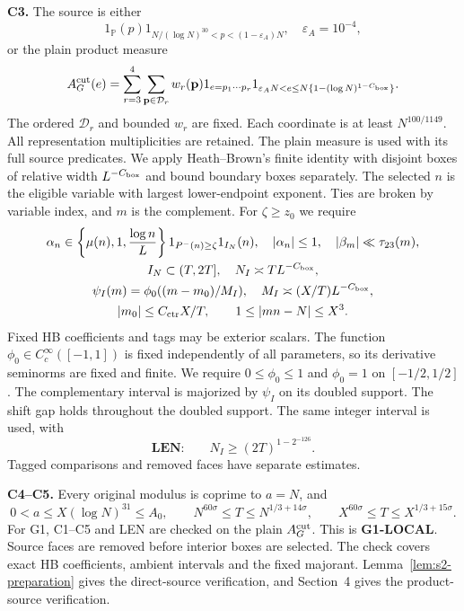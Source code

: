 \textbf{C3.} The source is either
\[
 1_{\mathbb P}(p)1_{N/(\log N)^{30}<p<(1-\varepsilon_A)N},\quad
 \varepsilon_A=10^{-4},
\]
or the plain product measure
\[
 A_G^{\rm cut}(e)=\sum_{r=3}^4\sum_{\mathbf p\in\mathcal D_r}
 w_r(\mathbf p)1_{e=p_1\cdots p_r}
 1_{\varepsilon_A N<e\le N\{1-(\log N)^{1-C_{\rm box}}\}}.
\]
The ordered $\mathcal D_r$ and bounded $w_r$ are fixed.
Each coordinate is at least $N^{100/1149}$.
All representation multiplicities are retained.
The plain measure is used with its full source predicates.
We apply Heath--Brown's finite identity \cite{ref6} with disjoint boxes of relative width $L^{-C_{\rm box}}$
and bound boundary boxes separately.
The selected $n$ is the eligible variable with largest lower-endpoint exponent.
Ties are broken by variable index, and $m$ is the complement.
For $\zeta\ge z_0$ we require
\[
\begin{gathered}
 \alpha_n\in\left\{\mu(n),1,{\log n\over L}\right\}
 1_{P^-(n)\ge\zeta}1_{I_N}(n),\quad |\alpha_n|\le1,
 \quad|\beta_m|\ll\tau_{23}(m),\\
 I_N\subset(T,2T],\quad N_I\asymp TL^{-C_{\rm box}},\\
 \psi_I(m)=\phi_0((m-m_0)/M_I),\quad M_I\asymp(X/T)L^{-C_{\rm box}},\\
 |m_0|\le C_{\rm ctr}X/T,\qquad 1\le|mn-N|\le X^3.
\end{gathered}
\]
Fixed HB coefficients and tags may be exterior scalars.
The function $\phi_0\in C_c^\infty([-1,1])$ is fixed independently of all parameters,
so its derivative seminorms are fixed and finite.
We require $0\le\phi_0\le1$ and $\phi_0=1$ on $[-1/2,1/2]$.
The complementary interval is majorized by $\psi_I$ on its doubled support.
The shift gap holds throughout the doubled support.
The same integer interval is used, with
\[
 \textbf{LEN:}\qquad N_I\ge(2T)^{1-2^{-126}}.
\]
Tagged comparisons and removed faces have separate estimates.

\textbf{C4--C5.} Every original modulus is coprime to $a=N$, and
\[
 0<a\le X(\log N)^{31}\le A_0,\qquad
 N^{60\sigma}\le T\le N^{1/3+14\sigma},\qquad
 X^{60\sigma}\le T\le X^{1/3+15\sigma}.
\]
For G1, C1--C5 and LEN are checked on the plain $A_G^{\rm cut}$.
This is \textbf{G1-LOCAL}.
Source faces are removed before interior boxes are selected.
The check covers exact HB coefficients, ambient intervals and the fixed majorant.
Lemma~\ref{lem:s2-preparation} gives the direct-source verification,
and Section~4 gives the product-source verification.

